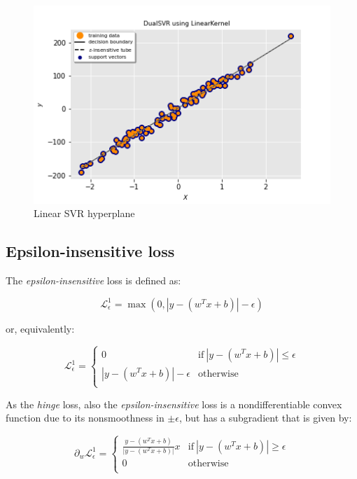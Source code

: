 \begin{figure}[h!]
	\centering
  	\includegraphics[scale=0.6]{img/linear_dual_l1_svr_hyperplane}
  	\caption{Linear SVR hyperplane}
  	\label{fig:linear_dual_l1_svr_hyperplane}
\end{figure}

\pagebreak

\subsection{Epsilon-insensitive loss}

The \emph{epsilon-insensitive} loss is defined as:

\begin{equation} \label{eq:eps_loss1}
	\mathcal{L}_\epsilon^1 = \max(0, |y - (w^T x + b)| - \epsilon)
\end{equation}

or, equivalently:

\begin{equation} \label{eq:eps_loss2}
	\mathcal{L}_\epsilon^1 = 
	\begin{cases}
		0 & \text{if} \ |y - (w^T x + b)| \leq \epsilon \\
		|y - (w^T x + b)| - \epsilon & \text{otherwise} \\
	\end{cases}
\end{equation}

As the \emph{hinge} loss, also the \emph{epsilon-insensitive} loss is a nondifferentiable convex function due to its nonsmoothness in $\pm\epsilon$, but has a subgradient that is given by:


\begin{equation} \label{eq:eps_loss_der}
	\partial_w \mathcal{L}_\epsilon^1=
		\begin{cases}
            \displaystyle \frac{y - (w^T x + b)}{|y - (w^T x + b)|}x & \text{if} \ |y - (w^T x + b)| \geq \epsilon \\
            0 & \text{otherwise} \\ 
        \end{cases}
\end{equation}

